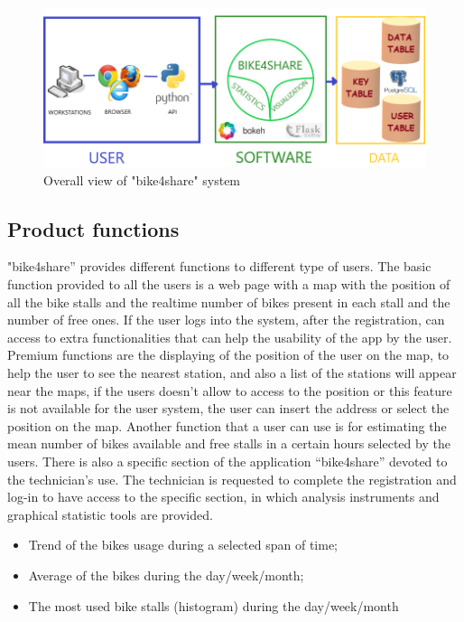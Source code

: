 \documentclass{article}
\begin{document}
\begin{figure}[h]
    \centering
    \includegraphics[width=0.75\linewidth]{image/BIKE4SHARE_SCHEMA.png}
    \caption{Overall view of "bike4share" system}
    \label{fig:schema}
\end{figure}

\subsection{Product functions}
"bike4share” provides different functions to different type of users. 
The basic function provided to all the users is a web page with a map with the position of all the bike stalls and the realtime number of bikes present in each stall and the number of free ones.
If the user logs into the system, after the registration, can access to extra functionalities that can help the usability of the app by the user. Premium functions are the displaying of the position of the user on the map, to help the user to see the nearest station, and also a list of the stations will appear near the maps, if the users doesn’t allow to access to the position or this feature is not available for the user system, the user can insert the address or select the position on the map. Another function that a user can use is for estimating the mean number of bikes available and free stalls in a certain hours selected by the users. 
There is also a specific section of the application “bike4share” devoted to the technician’s use. The technician is requested to complete the registration and log-in to have access to the specific section, in which analysis instruments and graphical statistic tools are provided. 
\begin{itemize}
    \item Trend of the bikes usage during a selected span of time;
    \item Average of the bikes during the day/week/month;
    \item The most used bike stalls (histogram) during the day/week/month
\end{itemize}
\end{document}
